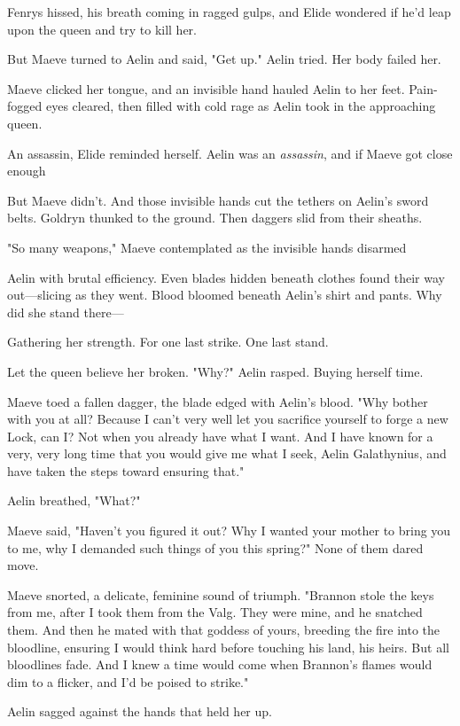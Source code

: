 Fenrys hissed, his breath coming in ragged gulps, and Elide wondered if he'd leap upon the queen and try to kill her.

But Maeve turned to Aelin and said, "Get up." Aelin tried. Her body failed her.

Maeve clicked her tongue, and an invisible hand hauled Aelin to her feet. Pain-fogged eyes cleared, then filled with cold rage as Aelin took in the approaching queen.

An assassin, Elide reminded herself. Aelin was an \emph{assassin}, and if Maeve got close enough 

But Maeve didn't. And those invisible hands cut the tethers on Aelin's sword belts. Goldryn thunked to the ground. Then daggers slid from their sheaths.

"So many weapons," Maeve contemplated as the invisible hands disarmed

Aelin with brutal efficiency. Even blades hidden beneath clothes found their way out---slicing as they went. Blood bloomed beneath Aelin's shirt and pants. Why did she stand there---

Gathering her strength. For one last strike. One last stand.

Let the queen believe her broken. "Why?" Aelin rasped. Buying herself time.

Maeve toed a fallen dagger, the blade edged with Aelin's blood. "Why bother with you at all? Because I can't very well let you sacrifice yourself to forge a new Lock, can I? Not when you already have what I want. And I have known for a very, very long time that you would give me what I seek, Aelin Galathynius, and have taken the steps toward ensuring that."

Aelin breathed, "What?"

Maeve said, "Haven't you figured it out? Why I wanted your mother to bring you to me, why I demanded such things of you this spring?" None of them dared move.

Maeve snorted, a delicate, feminine sound of triumph. "Brannon stole the keys from me, after I took them from the Valg. They were mine, and he snatched them. And then he mated with that goddess of yours, breeding the fire into the bloodline, ensuring I would think hard before touching his land, his heirs. But all bloodlines fade. And I knew a time would come when Brannon's flames would dim to a flicker, and I'd be poised to strike."

Aelin sagged against the hands that held her up.

